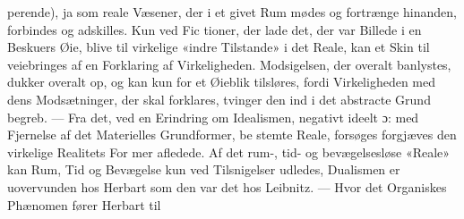 \documentclass[12pt,a4paper]{book}
\begin{document}
perende), ja som reale Væsener, der i et givet Rum mødes
og fortrænge hinanden, forbindes og adskilles. Kun ved Fic\-%
tioner, der lade det, der var Billede i en Beskuers Øie, blive
til virkelige «indre Tilstande» i det Reale, kan et Skin til\-%
veiebringes af en Forklaring af Virkeligheden. Modsigelsen,
der overalt banlystes, dukker overalt op, og kan kun for et
Øieblik tilsløres, fordi Virkeligheden med dens Modsætninger,
der skal forklares, tvinger den ind i det abstracte Grund\-%
begreb. --- Fra det, ved en Erindring om Idealismen, negativt
ideelt ɔ: med Fjernelse af det Materielles Grundformer, be\-%
stemte Reale, forsøges forgjæves den virkelige Realitets For\-%
mer afledede. Af det rum-, tid- og bevægelsesløse «Reale»
kan Rum, Tid og Bevægelse kun ved Tilsnigelser udledes,
Dualismen er uovervunden hos Herbart som den var det hos
Leibnitz. --- Hvor det Organiskes Phænomen fører Herbart til
\end{document}
